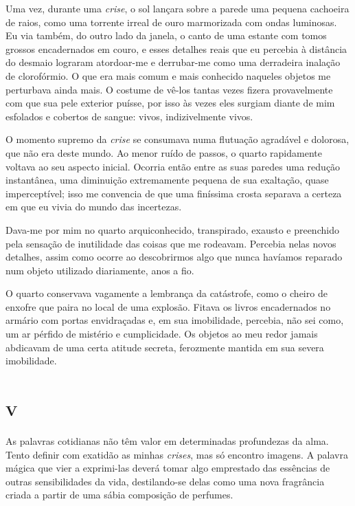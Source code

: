 Uma vez, durante uma \textit{crise}, o sol lançara sobre a parede uma pequena cachoeira de raios, como uma torrente irreal de ouro marmorizada com ondas luminosas. Eu via também, do outro lado da janela, o canto de uma estante com tomos grossos encadernados em couro, e esses detalhes reais que eu percebia à distância do desmaio lograram atordoar-me e derrubar-me como uma derradeira inalação de clorofórmio. O que era mais comum e mais conhecido naqueles objetos me perturbava ainda mais. O costume de vê-los tantas vezes fizera provavelmente com que sua pele exterior puísse, por isso às vezes eles surgiam diante de mim esfolados e cobertos de sangue: vivos, indizivelmente vivos.

O momento supremo da \textit{crise} se consumava numa flutuação agradável e dolorosa, que não era deste mundo. Ao menor ruído de passos, o quarto rapidamente voltava ao seu aspecto inicial. Ocorria então entre as suas paredes uma redução instantânea, uma diminuição extremamente pequena de sua exaltação, quase imperceptível; isso me convencia de que uma finíssima crosta separava a certeza em que eu vivia do mundo das incertezas.

Dava-me por mim no quarto arquiconhecido, transpirado, exausto e preenchido pela sensação de inutilidade das coisas que me rodeavam. Percebia nelas novos detalhes, assim como ocorre ao descobrirmos algo que nunca havíamos reparado num objeto utilizado diariamente, anos a fio.

O quarto conservava vagamente a lembrança da catástrofe, como o cheiro de enxofre que paira no local de uma explosão. Fitava os livros encadernados no armário com portas envidraçadas e, em sua imobilidade, percebia, não sei como, um ar pérfido de mistério e cumplicidade. Os objetos ao meu redor jamais abdicavam de uma certa atitude secreta, ferozmente mantida em sua severa imobilidade.


\chapter*{\huge\centering\textsc{v}}

As palavras cotidianas não têm valor em determinadas profundezas da alma. Tento definir com exatidão as minhas \textit{crises}, mas só encontro imagens. A palavra mágica que vier a exprimi-las deverá tomar algo emprestado das essências de outras sensibilidades da vida, destilando-se delas como uma nova fragrância criada a partir de uma sábia composição de perfumes.

